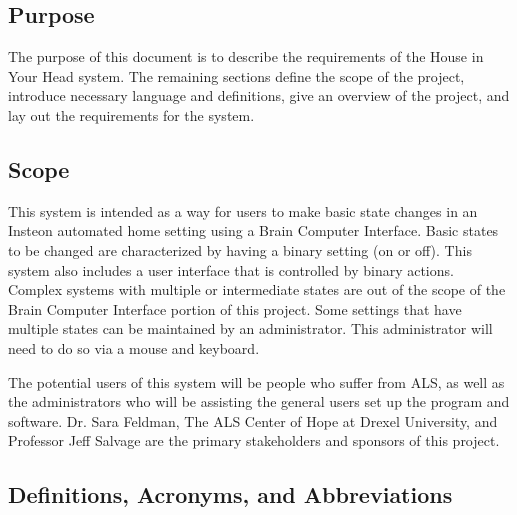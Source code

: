 \documentclass{article}
\begin{document}
\subsection{Purpose}

The purpose of this document is to describe the requirements of the House in
Your Head system. The remaining sections define the scope of the project,
introduce necessary language and definitions, give an overview of the project,
and lay out the requirements for the system.

\subsection{Scope}


This system is intended as a way for users to make basic state changes in an
Insteon automated home setting using a Brain Computer Interface. Basic states to be
changed are characterized by having a binary setting (on or off). This system
also includes a user interface that is controlled by binary actions. Complex
systems with multiple or intermediate states are out of the scope of the Brain
Computer Interface portion of this project. Some settings that have multiple
states can be maintained by an administrator. This administrator will need to
do so via a mouse and keyboard. 


The potential users of this system will be people who suffer from ALS, as well
as the administrators who will be assisting the general users set up the
program and software. Dr. Sara Feldman, The ALS Center of Hope at Drexel
University, and Professor Jeff Salvage are the primary stakeholders and
sponsors of this project.

\subsection{Definitions, Acronyms, and Abbreviations}
\end{document}
